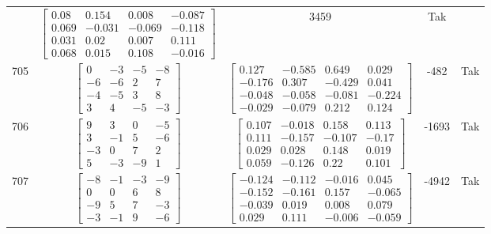 \documentclass[a4paper,12pt]{article}
\begin{document}
\begin{tabular}{c c c c c}
&
$\begin{bmatrix} 0.08 & 0.154 & 0.008 & -0.087 \\ 0.069 & -0.031 & -0.069 & -0.118 \\ 0.031 & 0.02 & 0.007 & 0.111 \\ 0.068 & 0.015 & 0.108 & -0.016 \end{bmatrix}$
&
3459
&
Tak
\\
705
&
$\begin{bmatrix} 0 & -3 & -5 & -8 \\ -6 & -6 & 2 & 7 \\ -4 & -5 & 3 & 8 \\ 3 & 4 & -5 & -3 \end{bmatrix}$
&
$\begin{bmatrix} 0.127 & -0.585 & 0.649 & 0.029 \\ -0.176 & 0.307 & -0.429 & 0.041 \\ -0.048 & -0.058 & -0.081 & -0.224 \\ -0.029 & -0.079 & 0.212 & 0.124 \end{bmatrix}$
&
-482
&
Tak
\\
706
&
$\begin{bmatrix} 9 & 3 & 0 & -5 \\ 3 & -1 & 5 & -6 \\ -3 & 0 & 7 & 2 \\ 5 & -3 & -9 & 1 \end{bmatrix}$
&
$\begin{bmatrix} 0.107 & -0.018 & 0.158 & 0.113 \\ 0.111 & -0.157 & -0.107 & -0.17 \\ 0.029 & 0.028 & 0.148 & 0.019 \\ 0.059 & -0.126 & 0.22 & 0.101 \end{bmatrix}$
&
-1693
&
Tak
\\
707
&
$\begin{bmatrix} -8 & -1 & -3 & -9 \\ 0 & 0 & 6 & 8 \\ -9 & 5 & 7 & -3 \\ -3 & -1 & 9 & -6 \end{bmatrix}$
&
$\begin{bmatrix} -0.124 & -0.112 & -0.016 & 0.045 \\ -0.152 & -0.161 & 0.157 & -0.065 \\ -0.039 & 0.019 & 0.008 & 0.079 \\ 0.029 & 0.111 & -0.006 & -0.059 \end{bmatrix}$
&
-4942
&
Tak
\\

\end{tabular}
\end{document}
